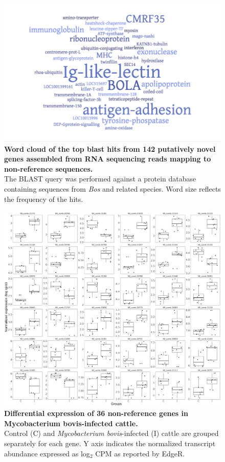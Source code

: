 \documentclass[../main.tex]{subfiles}
\begin{document}
\begin{flushleft}
\begin{figure}[!htb]
    \centering
    \includegraphics[width=\textwidth]{paper3/supplement/sp410.png}
    \caption[BLAST results of the novel genes]{\textbf{Word cloud of the top blast hits from 142 putatively novel genes assembled from RNA sequencing reads mapping to non-reference sequences.} \\
    \small{The BLAST query was performed against a protein database containing sequences from \emph{Bos} and related species. Word size reflects the frequency of the hits.}}
    \label{sup_fig:s410}
\end{figure}

\newpage

\begin{figure}[!htb]
    \centering
    \includegraphics[width=\textwidth]{paper3/supplement/sp411.png}
    \caption[Differential expression of the novel genes]{\textbf{Differential expression of 36 non-reference genes in Mycobacterium bovis-infected cattle.} \\
    \small{Control (C) and \emph{Mycobacterium bovis}-infected (I) cattle are grouped separately for each gene. Y axis indicates the normalized transcript abundance expressed as log$_2$ CPM as reported by EdgeR.}}
    \label{sup_fig:s411}
\end{figure}


\end{flushleft}
\end{document}

